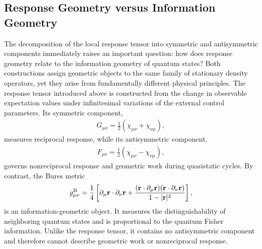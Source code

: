 \subsection{Response Geometry versus Information Geometry}
The decomposition of the local response tensor into symmetric
and antisymmetric components immediately raises an important
question: how does response geometry relate to the information
geometry of quantum states? Both constructions assign geometric
objects to the same family of stationary density operators, yet
they arise from fundamentally different physical principles.
The response tensor introduced above is constructed from the
change in observable expectation values under infinitesimal
variations of the external control parameters. Its symmetric
component,
\begin{align}
G_{\mu\nu}
=
\frac12
\left(
\chi_{\mu\nu}
+
\chi_{\nu\mu}
\right),
\end{align}
measures reciprocal response, while its antisymmetric component,
\begin{align}
F_{\mu\nu}
=
\frac12
\left(
\chi_{\mu\nu}
-
\chi_{\nu\mu}
\right),
\end{align}
governs nonreciprocal response and geometric work during
quasistatic cycles.
By contrast, the Bures metric
\begin{align}
g^{\rm B}_{\mu\nu}
=
\frac14
\left[
\partial_\mu\mathbf r\cdot\partial_\nu\mathbf r
+
\frac{
(\mathbf r\cdot\partial_\mu\mathbf r)
(\mathbf r\cdot\partial_\nu\mathbf r)
}
{1-|\mathbf r|^2}
\right],
\end{align}
is an information-geometric object. It measures the
distinguishability of neighboring quantum states and is
proportional to the quantum Fisher information. Unlike the
response tensor, it contains no antisymmetric component and
therefore cannot describe geometric work or nonreciprocal
response.



